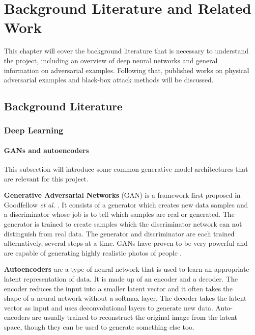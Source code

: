 \chapter{Background Literature and Related Work}
	\label{chap:background}
	
This chapter will cover the background literature that is necessary to understand the project, including an overview of deep neural networks and general information on adversarial examples. Following that, published works on physical adversarial examples and black-box attack methods will be discussed. 

\section{Background Literature}

\subsection{Deep Learning}
\subsubsection{GANs and autoencoders}
    
This subsection will introduce some common generative model architectures that are relevant for this project.

\textbf{Generative Adversarial Networks} (GAN) is a framework first proposed in Goodfellow \textit{et al.} \cite{gans}. It consists of a generator which creates new data samples and a discriminator whose job is to tell which samples are real or generated. The generator is trained to create samples which the discriminator network can not distinguish from real data. The generator and discriminator are each trained alternatively, several steps at a time. GANs have proven to be very powerful and are capable of generating highly realistic photos of people \cite{styleGAN}.

\textbf{Autoencoders} are a type of neural network that is used to learn an appropriate latent representation of data. It is made up of an encoder and a decoder. The encoder reduces the input into a smaller latent vector and it often takes the shape of a neural network without a softmax layer. The decoder takes the latent vector as input and uses deconvolutional layers to generate new data. Auto-encoders are usually trained to reconstruct the original image from the latent space, though they can be used to generate something else too.

